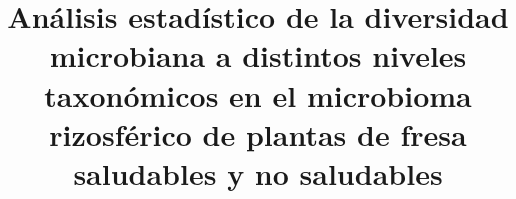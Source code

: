 \documentclass[11pt]{book}
\begin{document}


\renewcommand{\proofname}{Demostración}
\providecommand{\norm}[1]{\lVert#1\rVert} %
\providecommand{\innp}[1]{\langle#1\rangle} 
\newcommand{\seno}{\mathrm{sen}}
\newcommand{\diff}{\mathrm{d}}

\newtheorem{teo}{Teorema}[section] 
\newtheorem{cor}[teo]{Corolario}
\newtheorem{lem}[teo]{Lema}

\theoremstyle{definition}
\newtheorem{dfn}[teo]{Definición}

\theoremstyle{remark}
\newtheorem{obs}[teo]{Observación}

\allowdisplaybreaks
\raggedbottom %





\title{Análisis estadístico de la diversidad microbiana a distintos niveles taxonómicos en el microbioma rizosférico de plantas de fresa saludables y no saludables} %
\end{document}

